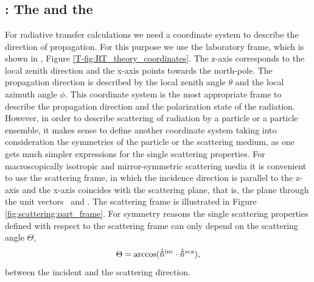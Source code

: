 \section{}
\label{sec:clouds:ssp}

\subsection[Coordinate systems]{: The
   and the  }
\label{sec:clouds:coordinate_sytems}

For radiative transfer calculations we need a coordinate system to
describe the direction of propagation. For this purpose we use the
laboratory frame, which is shown in
\theory, Figure \ref{T-fig:RT_theory_coordinates}.  The z-axis corresponds to the
local zenith direction and the x-axis points towards the
north-pole. The propagation direction is described by the local zenith
angle $\theta$ and the local azimuth angle $\phi$.  This coordinate
system is the most appropriate frame to describe the propagation
direction and the polarization state of the radiation.  However, in
order to describe scattering of radiation by a particle or a particle
ensemble, it makes sense to define another coordinate system taking
into consideration the symmetries of the particle or the scattering
medium, as one gets much simpler expressions for the single scattering
properties.  For macroscopically isotropic and mirror-symmetric
scattering media it is convenient to use the scattering frame, in
which the incidence direction is parallel to the z-axis and the x-axis
coincides with the scattering plane, that is, the plane through the
unit vectors \ and . The
scattering frame is illustrated in
Figure \ref{fig:scattering:part_frame}. For symmetry reasons the single
scattering properties defined with respect to the scattering frame can
only depend on the scattering angle $\Theta$,
\begin{equation}
  \label{eq:scat_angle}
  \Theta=\arccos(\hat{{\bf \hat{n}}}^{\mathrm{inc}} \cdot {\hat{\ensuremath{{\bf \hat{n}}}}^{\mathrm{sca}}}),
\end{equation}
between the incident and the scattering direction.

